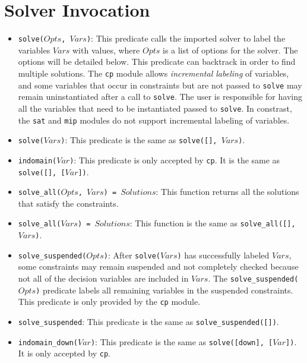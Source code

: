 \section{Solver Invocation}
\begin{itemize}
\item \texttt{solve($Opts$, $Vars$)}: This predicate calls the imported solver to label the variables $Vars$ with values, where $Opts$ is a list of options for the solver. The options will be detailed below. This predicate can backtrack in order to find multiple solutions. The \texttt{cp} module allows \textit{incremental labeling} of variables, and some variables that occur in constraints but are not passed to \texttt{solve} may remain uninstantiated after a call to \texttt{solve}. The user is responsible for having all the variables that need to be instantiated passed to \texttt{solve}. In constrast, the \texttt{sat} and \texttt{mip} modules do not support incremental labeling of variables.

\item\texttt{solve($Vars$)}: This predicate is the same as \texttt{solve([], $Vars$)}. 
\item \texttt{indomain($Var$)}: This predicate is only accepted by \texttt{cp}. It is the same as \texttt{solve([], [$Var$])}.
\item \texttt{solve\_all($Opts$, $Vars$) = $Solutions$}: This function returns all the solutions that satisfy the constraints.
\item \texttt{solve\_all($Vars$) = $Solutions$}: This function is the same as \texttt{solve\_all([],$Vars$)}.
\item \texttt{solve\_suspended($Opts$)}: After \texttt{solve($Vars$)} has successfully labeled $Vars$, some constraints may remain suspended and not completely checked because not all of the decision variables are included in $Vars$. The \texttt{solve\_suspended($Opts$)} predicate labels all remaining variables in the suspended constraints. This predicate is only provided by the \texttt{cp} module. 
\item \texttt{solve\_suspended}: This predicate is the same as \texttt{solve\_suspended([])}.
\item \texttt{indomain\_down($Var$)}: This predicate is the same as \texttt{solve([down], [$Var$])}. It is only accepted by \texttt{cp}. 
\end{itemize}


